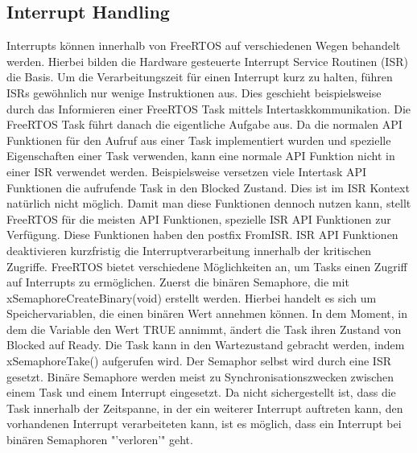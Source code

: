 \subsection{Interrupt Handling}
\label{sec:Interrupt}
Interrupts können innerhalb von FreeRTOS auf verschiedenen Wegen behandelt werden. Hierbei bilden die Hardware gesteuerte Interrupt Service Routinen (ISR) die Basis. Um die Verarbeitungszeit für einen Interrupt kurz zu halten, führen ISRs gewöhnlich nur wenige Instruktionen aus. Dies geschieht beispielsweise durch das Informieren einer FreeRTOS Task mittels Intertaskkommunikation. Die FreeRTOS Task führt danach die eigentliche Aufgabe aus. Da die normalen API Funktionen für den Aufruf aus einer Task implementiert wurden und spezielle Eigenschaften einer Task verwenden, kann eine normale API Funktion nicht in einer ISR verwendet werden. Beispielsweise versetzen viele Intertask API Funktionen die aufrufende Task in den Blocked Zustand. Dies ist im ISR Kontext natürlich nicht möglich. Damit man diese Funktionen dennoch nutzen kann, stellt FreeRTOS für die meisten API Funktionen, spezielle ISR API Funktionen zur Verfügung. Diese Funktionen haben den postfix FromISR. ISR API Funktionen deaktivieren kurzfristig die Interruptverarbeitung innerhalb der kritischen Zugriffe.
FreeRTOS bietet verschiedene Mög\-lich\-keit\-en an, um Tasks einen Zugriff auf Interrupts zu ermöglichen.\newline
Zuerst die binären Semaphore, die mit xSemaphoreCreateBinary(void) erstellt werden. Hierbei handelt es sich um Speichervariablen, die einen binären Wert annehmen können. In dem Moment, in dem die Variable den Wert TRUE annimmt, ändert die Task ihren Zustand von Blocked auf Ready. Die Task kann in den Wartezustand gebracht werden, indem xSemaphoreTake() aufgerufen wird. Der Semaphor selbst wird durch eine ISR gesetzt. 
Binäre Semaphore werden meist zu Synchronisationszwecken zwischen einem Task und einem Interrupt eingesetzt.
Da nicht sichergestellt ist, dass die Task innerhalb der Zeitspanne, in der ein weiterer Interrupt auftreten kann, den vorhandenen Interrupt verarbeiteten kann, ist es möglich, dass ein Interrupt bei binären Semaphoren "'verloren'" geht.
